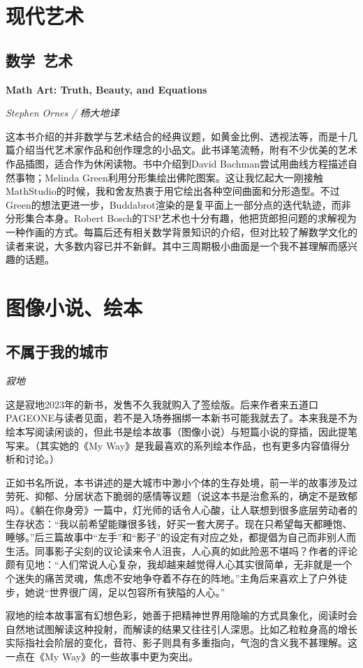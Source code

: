 \section{现代艺术}

\subsection*{数学\ 艺术}
\par \textbf{Math Art: Truth, Beauty, and Equations}
\par \emph{Stephen Ornes / 杨大地译} 

\par 这本书介绍的并非数学与艺术结合的经典议题，如黄金比例、透视法等，而是十几篇介绍当代艺术家作品和创作理念的小品文。此书译笔流畅，附有不少优美的艺术作品插图，适合作为休闲读物。书中介绍到David Bachman尝试用曲线方程描述自然事物；Melinda Green利用分形集绘出佛陀图案。这让我忆起大一刚接触MathStudio的时候，我和舍友热衷于用它绘出各种空间曲面和分形造型。不过Green的想法更进一步，Buddabrot渲染的是复平面上一部分点的迭代轨迹，而非分形集合本身。Robert Bosch的TSP艺术也十分有趣，他把货郎担问题的求解视为一种作画的方式。每篇后还有相关数学背景知识的介绍，但对比较了解数学文化的读者来说，大多数内容已并不新鲜。其中三周期极小曲面是一个我不甚理解而感兴趣的话题。
\par {}

\section{图像小说、绘本}

\subsection*{不属于我的城市}
\par \emph{寂地}

\par 这是寂地2023年的新书，发售不久我就购入了签绘版。后来作者来五道口PAGEONE与读者见面，若不是入场券捆绑一本新书可能我就去了。本来我是不为绘本写阅读闲谈的，但此书是绘本故事（图像小说）与短篇小说的穿插，因此提笔写来。（其实她的《My Way》是我最喜欢的系列绘本作品，也有更多内容值得分析和讨论。）
\par 正如书名所说，本书讲述的是大城市中渺小个体的生存处境，前一半的故事涉及过劳死、抑郁、分居状态下脆弱的感情等议题（说这本书是治愈系的，确定不是致郁吗）。《躺在你身旁》一篇中，灯光师的话令人心酸，让人联想到很多底层劳动者的生存状态：“我以前希望能赚很多钱，好买一套大房子。现在只希望每天都睡饱、睡够。”后三篇故事中“左手”和“影子”的设定有对应之处，都提倡为自己而非别人而生活。同事影子尖刻的议论读来令人沮丧，人心真的如此险恶不堪吗？作者的评论颇有见地：“人们常说人心复杂，我却越来越觉得人心其实很简单，无非就是一个个迷失的痛苦灵魂，焦虑不安地争夺着不存在的阵地。”主角后来喜欢上了户外徒步，她说“世界很广阔，足以包容所有狭隘的人心。”
\par 寂地的绘本故事富有幻想色彩，她善于把精神世界用隐喻的方式具象化，阅读时会自然地试图解读这种投射，而解读的结果又往往引人深思。比如乙粒粒身高的增长实际指社会阶层的变化，音符、影子则具有多重指向，气泡的含义我不甚理解。这一点在《My Way》的一些故事中更为突出。
\par {}
